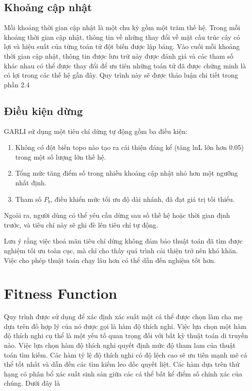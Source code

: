 \documentclass[12pt,a4paper]{report}
\begin{document}
\subsection{Khoảng cập nhật}

Mỗi khoảng thời gian cập nhật là một chu kỳ gồm một trăm thế hệ. Trong mỗi khoảng thời gian cập nhật, thông tin về những thay đổi về mặt cấu trúc cây có lợi và hiệu suất của từng toán tử đột biến được lập bảng. Vào cuối mỗi khoảng thời gian cập nhật, thông tin được lưu trữ này được đánh giá và các tham số khác nhau có thể được thay đổi để ưu tiên những toán tử đã được chứng minh là có lợi trong các thế hệ gần đây. Quy trình này sẽ được thảo luận chi tiết trong phần 2.4


\subsection{Điều kiện dừng}

GARLI sử dụng một tiêu chí dừng tự động gồm ba điều kiện: 

\begin{enumerate}
    \item Không có đột biến topo nào tạo ra cải thiện đáng kể (tăng lnL lớn hơn 0.05) trong một số lượng lớn thế hệ.
    \item Tổng mức tăng điểm số trong nhiều khoảng cập nhật nhỏ hơn một ngưỡng nhất định.
    \item Tham số \(P_b\), điều khiển mức tối ưu độ dài nhánh, đã đạt giá trị tối thiểu.
\end{enumerate}

Ngoài ra, người dùng có thể yêu cầu dừng sau số thế hệ hoặc thời gian định trước, và tiêu chí này sẽ ghi đè lên tiêu chí tự động.

Lưu ý rằng việc thoả mãn tiêu chí dừng không đảm bảo thuật toán đã tìm được nghiệm tối ưu toàn cục, mà chỉ cho thấy quá trình cải thiện trở nên khó khăn. Việc cho phép thuật toán chạy lâu hơn có thể dẫn đến nghiệm tốt hơn.
\section{Fitness Function}

Quy trình được sử dụng để xác định xác suất một cá thể được chọn làm cha mẹ dựa trên đô hợp lý của nó được gọi là hàm độ thích nghi. Việc lựa chọn một hàm độ thích nghi cụ thể là một yếu tố quan trọng đối với bất kỳ thuật toán di truyền nào. Việc lựa chọn hàm độ thích nghi quyết định mức độ tham lam của thuật toán tìm kiếm. Các hàm tỷ lệ độ thích nghi có độ lệch cao sẽ ưu tiên mạnh mẽ cá thể tốt nhất và dẫn đến các tìm kiếm leo dốc quyết liệt. Các hàm dựa trên thứ hạng có phân bổ xác suất sinh sản giữa các cá thể bất kể điểm số chính xác của chúng. Dưới đây là 
\end{document}
